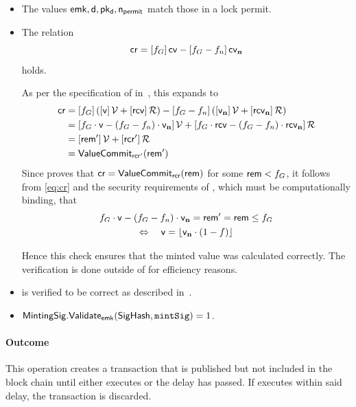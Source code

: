 \begin{itemize}
    \item The values $\mathsf{emk}, \mathsf{d}, \mathsf{pk_d}, \mathsf{n_{permit}}$ match those in a lock permit.
    
    \item The relation
    \begin{equation}\label{eq:cr}
        \mathsf{cr} = [f_G]\,\mathsf{cv} - [f_G - f_n]\,\mathsf{cv_{\mathbf{n}}}
    \end{equation}
    holds.
    
    As per the specification of \vcm in~\cite[Section 5.4.7.3]{hopwood2016zcash}, this expands to
    \begin{align*}
        \mathsf{cr} &= [f_G]\, ([\mathsf{v}]\, \mathcal{V} + [\mathsf{rcv}]\, \mathcal{R}) - [f_G - f_n]\, ([\mathsf{v_{\mathbf{n}}}]\, \mathcal{V} + [\mathsf{rcv_{\mathbf{n}}}]\, \mathcal{R})\\
        &= [f_G \cdot \mathsf{v} - (f_G - f_n) \cdot \mathsf{v_{\mathbf{n}}}]\, \mathcal{V} + [f_G \cdot \mathsf{rcv} - (f_G - f_n) \cdot \mathsf{rcv_{\mathbf{n}}}]\, \mathcal{R}\\
        &= [\mathsf{rem}']\, \mathcal{V} + [\mathsf{rcr}']\, \mathcal{R}\\
        &= \mathsf{ValueCommit}_{\mathsf{rcr}'}(\mathsf{rem}')
    \end{align*}
    Since \pim proves that $\mathsf{cr} = \mathsf{ValueCommit}_{\mathsf{rcr}}(\mathsf{rem})$ for some $\mathsf{rem} < f_G$, it follows from \cref{eq:cr} and the security requirements of \vcm, which must be computationally binding, that
    \begin{gather*}
        f_G \cdot \val - (f_G - f_n) \cdot \valn = \rem' = \rem \leq f_G\\
        \Leftrightarrow \quad \val = \left \lfloor{\valn \cdot (1 - f)}\right \rfloor
    \end{gather*}
    
    Hence this check ensures that the minted value was calculated correctly.
    The verification is done outside of \pim for efficiency reasons.

    \item \pim is verified to be correct as described in~\cite[Appendix B.2]{hopwood2016zcash}.
    
    \item $\mathsf{MintingSig}.\mathsf{Validate}_{\mathsf{emk}}(\mathsf{SigHash}, \mathtt{mintSig}) = 1$.
\end{itemize}

\paragraph{Outcome}
This operation creates a \mint transaction that is published but not included in the block chain until either \vault executes \confirmIssueop or the delay \dci has passed.
If \vault executes \challengeIssueop within said delay, the transaction is discarded.


